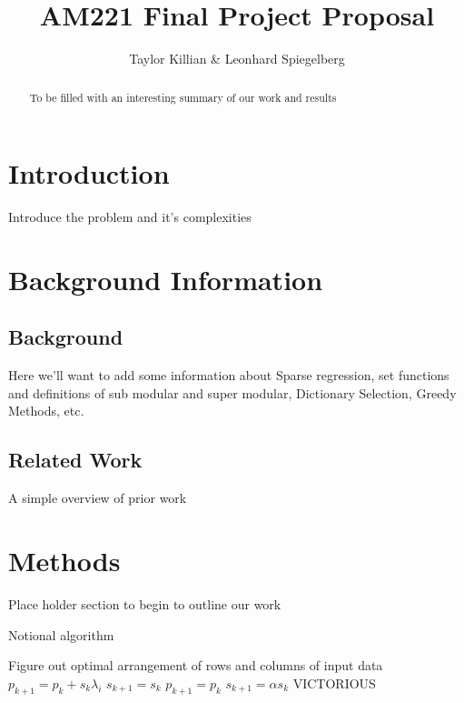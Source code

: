 \documentclass{article}
\begin{document}
\title{AM221 Final Project Proposal}
\author{Taylor Killian \& Leonhard Spiegelberg}
\maketitle

\begin{abstract}
To be filled with an interesting summary of our work and results

\end{abstract}

\section{Introduction} \label{introduction}
Introduce the problem and it's complexities

\section{Background Information} \label{background}
\subsection{Background}
Here we'll want to add some information about Sparse regression, set functions and definitions of sub modular and super modular, Dictionary Selection, Greedy Methods, etc.

\subsection{Related Work}
A simple overview of prior work


\section{Methods} \label{methods}

Place holder section to begin to outline our work

\begin{algorithm}
  \caption{Notional algorithm}
  \label{alg:compass}
\begin{algorithmic}
  \STATE  Figure out optimal arrangement of rows and columns of input data
  \STATE $p_{k+1} = p_k + s_k\lambda_i$
  \STATE $s_{k+1} = s_k$
  \ELSE
  \STATE $p_{k+1} = p_{k}$
  \STATE $s_{k+1} = \alpha s_k$
  \ENDIF
  \ENDWHILE
  \RETURN VICTORIOUS
\end{algorithmic}
\end{algorithm}
\end{document}

